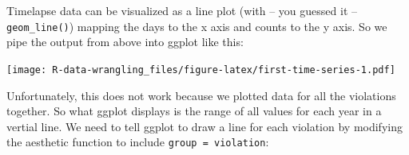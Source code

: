 \documentclass[]{book}
\newenvironment{Shaded}{\begin{snugshade}}{\end{snugshade}}
\newcommand{\DataTypeTok}[1]{\textcolor[rgb]{0.13,0.29,0.53}{#1}}
\newcommand{\KeywordTok}[1]{\textcolor[rgb]{0.13,0.29,0.53}{\textbf{#1}}}
\newcommand{\NormalTok}[1]{#1}
\newcommand{\OperatorTok}[1]{\textcolor[rgb]{0.81,0.36,0.00}{\textbf{#1}}}
\newcommand{\OtherTok}[1]{\textcolor[rgb]{0.56,0.35,0.01}{#1}}
\newcommand{\StringTok}[1]{\textcolor[rgb]{0.31,0.60,0.02}{#1}}
\begin{document}
\begin{Shaded}
\end{Shaded}

Timelapse data can be visualized as a line plot (with -- you guessed it -- \texttt{geom\_line()}) mapping the days to the x axis and counts to the y axis. So we pipe the output from above into ggplot like this:

\begin{Shaded}
\end{Shaded}

\texttt{[image: R-data-wrangling\_files/figure-latex/first-time-series-1.pdf]}

Unfortunately, this does not work because we plotted data for all the violations together. So what ggplot displays is the range of all values for each year in a vertial line. We need to tell ggplot to draw a line for each violation by modifying the aesthetic function to include \texttt{group\ =\ violation}:

\begin{Shaded}
\end{Shaded}
\end{document}
